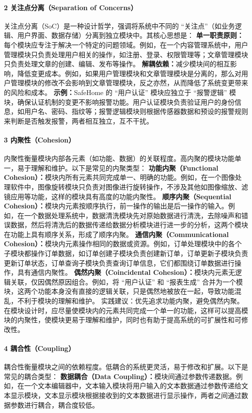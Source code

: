 \paragraph{2 关注点分离（Separation of Concerns）}\label{ux5173ux6ce8ux70b9ux5206ux79bbseparation-of-concerns}
关注点分离（SoC）是一种设计哲学，强调将系统中不同的 ``关注点''（如业务逻辑、用户界面、数据存储）分离到独立模块中。其核心思想是：
\textbf{单一职责原则：}每个模块应专注于解决一个特定的问题领域。例如，在一个内容管理系统中，用户管理模块只负责处理用户相关的操作，如注册、登录、权限管理等；文章管理模块只负责处理文章的创建、编辑、发布等操作。
\textbf{解耦依赖：}减少模块间的相互影响，降低变更成本。例如，如果用户管理模块和文章管理模块是分离的，那么对用户管理模块的修改不会影响到文章管理模块，反之亦然，从而降低了系统变更带来的风险和成本。
\textbf{示例：}SafeHome 的 ``用户认证'' 模块应独立于 ``报警逻辑''
模块，确保认证机制的变更不影响报警功能。用户认证模块负责验证用户的身份信息，如用户名、密码、指纹等；报警逻辑模块则根据传感器数据和预设的报警规则来判断是否触发报警，两者相互独立，互不干扰。 \paragraph{3
内聚性（Cohesion）}\label{ux5185ux805aux6027cohesion} 内聚性衡量模块内部各元素（如功能、数据）的关联程度。高内聚的模块功能单一，易于理解和维护。以下是常见的内聚类型：
\textbf{功能内聚（Functional
Cohesion）：}模块内所有元素共同完成单一、明确的功能。例如，在一个图像处理软件中，图像旋转模块只负责对图像进行旋转操作，不涉及其他如图像缩放、滤镜应用等功能，这样的模块具有高度的功能内聚性。
\textbf{顺序内聚（Sequential
Cohesion）：}模块内元素按顺序执行，前一操作的输出是后一操作的输入。例如，在一个数据处理系统中，数据清洗模块先对原始数据进行清洗，去除噪声和错误数据，然后将清洗后的数据传递给数据分析模块进行进一步的分析，这两个模块在功能上具有顺序关系，形成了顺序内聚。
\textbf{通信内聚（Communicational
Cohesion）：}模块内元素操作相同的数据或资源。例如，订单处理模块中的各个子模块都操作订单数据，如订单创建子模块负责创建新订单，订单更新子模块负责更新订单状态，订单查询子模块负责查询订单信息，它们都围绕订单数据进行操作，具有通信内聚性。
\textbf{偶然内聚（Coincidental Cohesion）：}模块内元素无逻辑关联，仅因偶然原因组合。例如，将 ``用户认证'' 和 ``报表生成''
合并为一个模块，这两个功能本身没有直接的逻辑关联，只是偶然地被放在一起，导致功能混乱，不利于模块的理解和维护。
实践建议：优先追求功能内聚，避免偶然内聚。在模块设计时，应尽量使模块内的元素共同完成一个单一的功能，这样可以提高模块的内聚性，使模块更易于理解和维护，同时也有助于提高系统的可扩展性和可修改性。 \paragraph{4
耦合性（Coupling）}\label{ux8026ux5408ux6027coupling} 耦合性衡量模块之间的依赖程度。低耦合的系统更灵活，易于修改和扩展。以下是常见的耦合类型： \textbf{数据耦合（Data
Coupling）：}模块间通过参数传递数据。例如，在一个文本编辑器中，文本输入模块将用户输入的文本数据通过参数传递给文本显示模块，文本显示模块根据接收到的文本数据进行显示操作，两者之间通过数据参数进行耦合，耦合度较低。
